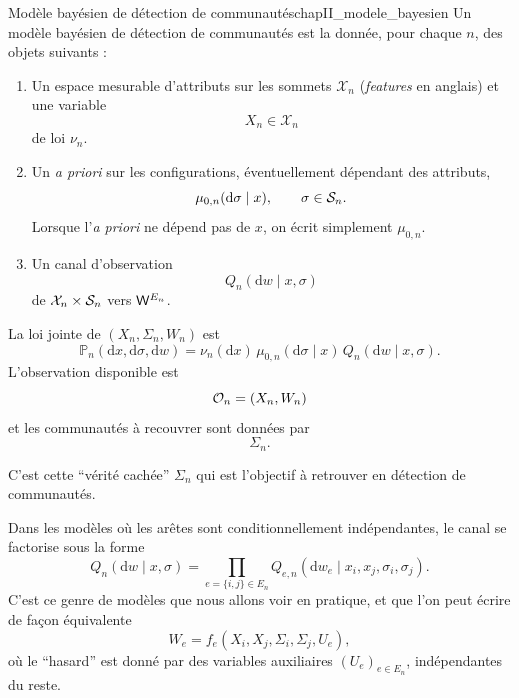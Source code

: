 \begin{Definition}{Modèle bayésien de détection de communautés}{chapII_modele_bayesien}
Un modèle bayésien de détection de communautés est la donnée, pour chaque $n$, des objets suivants :
\begin{enumerate}
    \item Un espace mesurable d'attributs sur les sommets $\mathcal X_n$ (\emph{features} en anglais) et une variable
    \[
        X_n\in\mathcal X_n
    \]
    de loi $\nu_n$.
    \item Un \emph{a priori} sur les configurations, éventuellement dépendant des attributs,
    \[
        \mu_{0,n}(\mathrm d\sigma\mid x),\qquad \sigma\in\mathcal S_n.
    \]
    Lorsque l'\emph{a priori} ne dépend pas de $x$, on écrit simplement $\mu_{0,n}$.
    \item Un canal d'observation
    \[
        Q_n(\mathrm dw\mid x,\sigma)
    \]
    de $\mathcal X_n\times\mathcal S_n$ vers $\mathsf W^{E_n}$.
\end{enumerate}

La loi jointe de $(X_n,\Sigma_n,W_n)$ est
\begin{equation}
    \mathbb P_n(\mathrm dx,\mathrm d\sigma,\mathrm dw)
    =
    \nu_n(\mathrm dx)\,\mu_{0,n}(\mathrm d\sigma\mid x)\,Q_n(\mathrm dw\mid x,\sigma).
    \label{eq:chapII_loi_jointe_generale}
\end{equation}
L'observation disponible est
\[
    \mathcal O_n=(X_n,W_n)
\]
et les communautés à recouvrer sont données par 
\[
\Sigma_n .
\]

C'est cette ``vérité cachée'' $\Sigma_n$ qui est l'objectif à retrouver en détection de communautés.
\end{Definition}

Dans les modèles où les arêtes sont conditionnellement indépendantes, le canal se factorise sous la forme
\begin{equation}
    Q_n(\mathrm dw\mid x,
    \sigma)
    =
    \prod_{e=\{i,j\}\in E_n}Q_{e,n}(\mathrm dw_e\mid x_i,x_j,\sigma_i,\sigma_j).
    \label{eq:chapII_canal_produit}
\end{equation}
C'est ce genre de modèles que nous allons voir en pratique, et que l'on peut écrire de façon équivalente
\[
    W_e=f_e(X_i,X_j,\Sigma_i,\Sigma_j,U_e),
\]
où le ``hasard'' est donné par des variables auxiliaires $(U_e)_{e\in E_n}$, indépendantes du reste.

